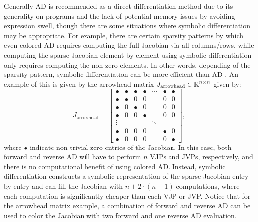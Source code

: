 Generally AD is recommended as a direct differentiation method due to its generality on programs and the lack of potential memory issues by avoiding expression swell, though there are some situations where symbolic differentiation may be appropriate. 
For example, there are certain sparsity patterns by which even colored AD  requires computing the full Jacobian via all columns/rows, while computing the sparse Jacobian element-by-element using symbolic differentiation only requires computing the non-zero elements.
In other words, depending  of the sparsity pattern, symbolic differentiation can be more efficient than AD \cite{Lantoine_Russell_Dargent_2012}.
An example of this is given by the arrowhead matrix $J_{\text{arrowhead}} \in \operatorname{\mathbb{R}}^{n \times n}$ given by:
\begin{equation}
    J_{\text{arrowhead}} = \begin{bmatrix}
        \bullet & \bullet & \bullet & \bullet & \cdots & \bullet  & \bullet   \\
        \bullet & \bullet & 0  &  0    &   & 0        & 0        \\
        \bullet & 0 & \bullet & 0 & & 0        & 0        \\
        \bullet & 0 & 0 & \bullet & & 0 & 0 \\
        \vdots & & & & \ddots & &  \\
        \bullet & 0 & 0 & 0   &   & \bullet   & 0        \\
        \bullet & 0 & 0        & 0    &    & 0        & \bullet
    \end{bmatrix},
\end{equation}
where $\bullet$ indicate non trivial zero entries of the Jacobian.
In this case, both forward and reverse AD will have to perform $n$ VJPs and JVPs, respectively, and there is no computational benefit of using colored AD. 
Instead, symbolic differentiation constructs a symbolic representation of the sparse Jacobian entry-by-entry and can fill the Jacobian with $n + 2 \cdot (n-1)$ computations, where each computation is significantly cheaper than each VJP or JVP. 
Notice that for the arrowhead matrix example, a combination of forward and reverse AD can be used to color the Jacobian with two forward and one reverse AD evaluation. 

